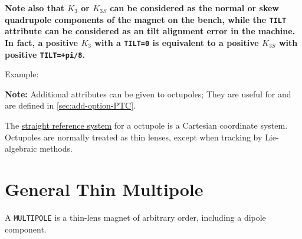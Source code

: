 \textbf{Note also that $K_3$ or $K_{3S}$ can be considered as the normal or
  skew quadrupole components of the magnet on the bench, while the
  \texttt{TILT} attribute can be considered as an tilt alignment error
  in the machine. In fact, a positive $K_3$ with a \texttt{TILT=0} is
  equivalent to a positive $K_{3S}$ with positive \texttt{TILT=+pi/8}.}

Example:

\textbf{Note:} Additional attributes can be given to octupoles; They
are useful for \ptc and are defined in \ref{sec:add-option-PTC}.

The \hyperref[subsec:local-straight]{straight reference system} for a
octupole is a Cartesian coordinate system. Octupoles are normally
treated as thin lenses, except when tracking by Lie-algebraic methods.



\section{General Thin Multipole}
\label{sec:multipole}

A \texttt{MULTIPOLE} is a thin-lens magnet of arbitrary order, including a
dipole component.


